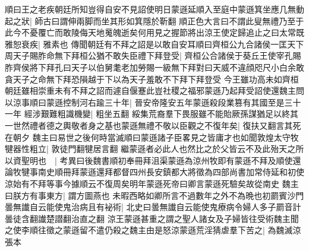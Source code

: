 順曰王之老疾朝廷所知豈得自安不見詔使明日蒙遜延順入至庭中蒙遜箕坐應几無動起之狀|{
	師古曰謂伸兩脚而坐其形如箕隱於靳翻}
順正色大言曰不謂此叟無禮乃至于此今不憂覆亡而敢陵侮天地䰟魄逝矣何用見之握節將出涼王使定歸追止之曰太常既雅恕衰疾|{
	雅素也}
傳聞朝廷有不拜之詔是以敢自安耳順曰齊桓公九合諸侯一匡天下周天子賜胙命無下拜桓公猶不敢失臣禮下拜登受|{
	齊桓公合諸侯于葵丘王使宰孔賜胙齊侯將下拜孔曰天子以伯舅耄老加勞賜一級無下拜對曰天威不違顔咫尺小白余敢貪天子之命無下拜恐隕越于下以為天子羞敢不下拜下拜登受}
今王雖功高未如齊桓朝廷雖相崇重未有不拜之詔而遽自偃蹇此豈社稷之福邪蒙遜乃起拜受詔使還魏主問以涼事順曰蒙遜控制河右踰三十年|{
	晉安帝隆安五年蒙遜殺段業篡有其國至是三十一年}
經涉艱難粗識機變|{
	粗坐五翻}
綏集荒裔羣下畏服雖不能貽厥孫謀猶足以終其一世然禮者德之輿敬者身之基也蒙遜無禮不敬以臣觀之不復年矣|{
	復扶又翻言其死在朝夕}
魏主曰易世之後何時當滅順曰蒙遜諸子臣畧見之皆庸才也如聞敦煌太守牧犍器性粗立|{
	敦徒門翻犍居言翻}
繼蒙遜者必此人也然比之於父皆云不及此殆天之所以資聖明也　|{
	考異曰後魏書順初奉冊拜沮渠蒙遜為涼州牧即有蒙遜不拜及順使還論牧犍事南史順冊拜蒙遜還拜都督四州長安鎮都大將徵為四部尚書加常侍延和初使涼始有不拜等事今據順云不復周矣明年蒙遜死帝曰卿言蒙遜死驗矣故從南史}
魏主曰朕方有事東方|{
	謂方圖燕也}
未暇西略如卿所言不過數年之外不為晩也初罽賓沙門曇無䜟自云能使鬼治病且有袐術|{
	北史曰曇無䜟自云能使鬼療病令婦人多子罽音計曇徒含翻䜟楚譛翻治直之翻}
涼王蒙遜甚重之謂之聖人諸女及子婦皆往受術魏主聞之使李順往徵之蒙遜留不遣仍殺之魏主由是怒涼蒙遜荒淫猜虐羣下苦之|{
	為魏滅涼張本}



